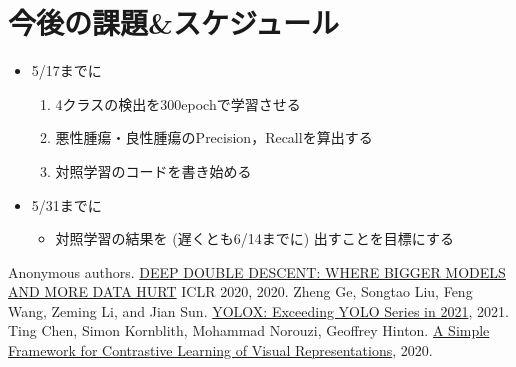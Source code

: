 \documentclass[a4j]{ujarticle}
\begin{document}
    \section{今後の課題\&スケジュール}
        \begin{itemize}
            \item 5/17までに
            \begin{enumerate}
                \item 4クラスの検出を300epochで学習させる
                \item 悪性腫瘍・良性腫瘍のPrecision，Recallを算出する
                \item 対照学習のコードを書き始める
            \end{enumerate}
            \item 5/31までに
            \begin{itemize}
                \item 対照学習の結果を (遅くとも6/14までに) 出すことを目標にする
            \end{itemize}
        \end{itemize}

    \begin{thebibliography}{9}
         Anonymous authors. \href{https://openreview.net/attachment?id=B1g5sA4twr&name=original_pdf}{DEEP DOUBLE DESCENT: WHERE BIGGER MODELS AND MORE DATA HURT} ICLR 2020, 2020.
         Zheng Ge, Songtao Liu, Feng Wang, Zeming Li, and Jian Sun. \href{https://arxiv.org/pdf/2107.08430.pdf}{YOLOX: Exceeding YOLO Series in 2021}, 2021.
         Ting Chen, Simon Kornblith, Mohammad Norouzi, Geoffrey Hinton. \href{https://arxiv.org/pdf/2002.05709.pdf}{A Simple Framework for Contrastive Learning of Visual Representations}, 2020.
    \end{thebibliography}
\end{document}
